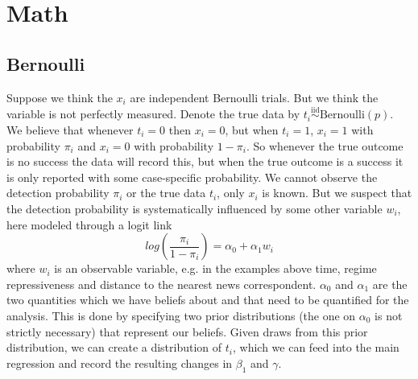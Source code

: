 \documentclass[fignum,letterpaper,12pt]{article}
\newcommand{\iid}{\stackrel{\mathrm{iid}}{\sim}}
\begin{document}
\section{Math}

\subsection{Bernoulli}
Suppose we think the $x_i$ are independent Bernoulli trials. But we think the variable is not perfectly measured. Denote the true data by $t_i \iid \text{Bernoulli}(p)$. We believe that whenever $t_i=0$ then $x_i=0$, but when $t_i=1$, $x_i=1$ with probability $\pi_i$ and $x_i=0$ with probability $1-\pi_i$. So whenever the true outcome is no success the data will record this, but when the true outcome is a success it is only reported with some case-specific probability. We cannot observe the detection probability $\pi_i$ or the true data $t_i$, only $x_i$ is known. But we suspect that the detection probability is systematically influenced by some other variable $w_i$, here modeled through a logit link
\begin{equation}
log \left ( \frac{\pi_i}{1-\pi_i} \right ) = \alpha_0 + \alpha_1 w_i
\end{equation}
where $w_i$ is an observable variable, e.g. in the examples above time, regime repressiveness and distance to the nearest news correspondent. $\alpha_0$ and $\alpha_1$ are the two quantities which we have beliefs about and that need to be quantified for the analysis. This is done by specifying two prior distributions (the one on $\alpha_0$ is not strictly necessary) that represent our beliefs. Given draws from this prior distribution, we can create a distribution of $t_i$, which we can feed into the main regression and record the resulting changes in $\beta_1$ and $\gamma$. 
\end{document}
